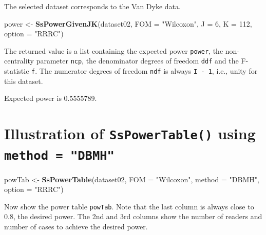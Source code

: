 \documentclass[]{book}
\newenvironment{Shaded}{\begin{snugshade}}{\end{snugshade}}
\newcommand{\CommentTok}[1]{\textcolor[rgb]{0.56,0.35,0.01}{\textit{#1}}}
\newcommand{\DataTypeTok}[1]{\textcolor[rgb]{0.13,0.29,0.53}{#1}}
\newcommand{\DecValTok}[1]{\textcolor[rgb]{0.00,0.00,0.81}{#1}}
\newcommand{\KeywordTok}[1]{\textcolor[rgb]{0.13,0.29,0.53}{\textbf{#1}}}
\newcommand{\NormalTok}[1]{#1}
\newcommand{\StringTok}[1]{\textcolor[rgb]{0.31,0.60,0.02}{#1}}
\begin{document}
The selected dataset corresponds to the Van Dyke data.

\begin{Shaded}
\begin{Highlighting}[]
\NormalTok{power <-}\StringTok{ }\KeywordTok{SsPowerGivenJK}\NormalTok{(dataset02, }\DataTypeTok{FOM =} \StringTok{"Wilcoxon"}\NormalTok{, }\DataTypeTok{J =} \DecValTok{6}\NormalTok{, }\DataTypeTok{K =} \DecValTok{112}\NormalTok{, }\DataTypeTok{option =} \StringTok{"RRRC"}\NormalTok{)}
\end{Highlighting}
\end{Shaded}

The returned value is a list containing the expected power \texttt{power}, the non-centrality parameter \texttt{ncp}, the denominator degrees of freedom \texttt{ddf} and the F-statistic \texttt{f}. The numerator degrees of freedom \texttt{ndf} is always \texttt{I\ -\ 1}, i.e., unity for this dataset.

\begin{Shaded}
\end{Shaded}

Expected power is 0.5555789.

\hypertarget{illustration-of-sspowertable-using-method-dbmh}{%
\section{\texorpdfstring{Illustration of \texttt{SsPowerTable()} using \texttt{method\ =\ "DBMH"}}{Illustration of SsPowerTable() using method = "DBMH"}}\label{illustration-of-sspowertable-using-method-dbmh}}

\begin{Shaded}
\begin{Highlighting}[]
\NormalTok{powTab <-}\StringTok{ }\KeywordTok{SsPowerTable}\NormalTok{(dataset02, }\DataTypeTok{FOM =} \StringTok{"Wilcoxon"}\NormalTok{, }\DataTypeTok{method =} \StringTok{"DBMH"}\NormalTok{, }\DataTypeTok{option =} \StringTok{"RRRC"}\NormalTok{)}
\end{Highlighting}
\end{Shaded}

Now show the power table \texttt{powTab}. Note that the last column is always close to 0.8, the desired power. The 2nd and 3rd columns show the number of readers and number of cases to achieve the desired power.
\end{document}
